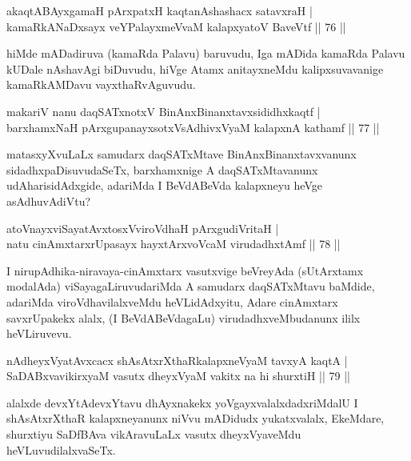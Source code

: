 \begin{shl}
akaqtABAyxgamaH pArxpatxH kaqtanAshashacx satavxraH  | \\
kamaRkANaDxsayx veYPalayxmeVvaM kalapxyatoV BaveVtf \hfill||  76 ||  
\end{shl}

\begin{artha}
hiMde mADadiruva (kamaRda Palavu) baruvudu, Iga mADida kamaRda Palavu kUDale nAshavAgi biDuvudu, hiVge Atamx anitayxneMdu kalipxsuvavanige kamaRkAMDavu vayxthaRvAguvudu.
\end{artha}


\begin{shl}
makariV nanu daqSATxnotxV BinAnxBinanxtavxsididhxkaqtf  | \\
barxhamxNaH pArxgupanayxsotxV\s sAdhivxVyaM kalapxnA kathamf \hfill||  77 ||  
\end{shl}

\begin{artha}
matasxyXvuLaLx samudarx daqSATxMtave BinAnxBinanxtavxvanunx sidadhxpaDisuvudaSeTx, barxhamxnige A daqSATxMtavanunx udAharisidAdxgide, adariMda I BeVdABeVda kalapxneyu heVge asAdhuvAdiVtu?
\end{artha}


\begin{shl}
atoV\s nayxviSayatAvxtosxV\s viroVdhaH pArxgudiVritaH  | \\
natu cinAmxtarxrUpasayx hayxtArxvoVcaM virudadhxtAmf \hfill||  78 ||  
\end{shl}

\begin{artha}
I nirupAdhika-niravaya-cinAmxtarx vasutxvige beVreyAda (sUtArxtamx modalAda) viSayagaLiruvudariMda A samudarx daqSATxMtavu baMdide, adariMda viroVdhavilalxveMdu heVLidAdxyitu, Adare cinAmxtarx savxrUpakekx alalx, (I BeVdABeVdagaLu) virudadhxveMbudanunx ililx heVLiruvevu.
\end{artha}

\begin{shl}
nAdheyxVyatAvxcacx shAsAtxrXthaRkalapxneVyaM tavxyA kaqtA  | \\
SaDABxvavikirxyaM vasutx dheyxVyaM vakitx na hi shurxtiH \hfill||  79 ||  
\end{shl}

\begin{artha}
alalxde devxYtAdevxYtavu dhAyxnakekx yoVgayxvalalxdadxriMdalU I shAsAtxrXthaR kalapxneyanunx niVvu mADidudx yukatxvalalx, EkeMdare, shurxtiyu SaDfBAva vikAravuLaLx vasutx dheyxVyaveMdu heVLuvudilalxvaSeTx.
\end{artha}


